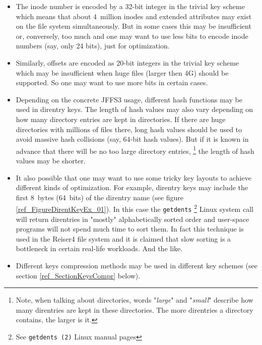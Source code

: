 \begin{itemize}

\item The inode number is encoded by a \mbox{32-bit} integer in the trivial key
scheme which means that about 4~million inodes and extended attributes may
exist on the file system simultaneously. But in some cases this may be
insufficient or, conversely, too much and one may want to use less bits to
encode inode numbers (say, only 24 bits), just for optimization.

\item Similarly, offsets are encoded as \mbox{20-bit} integers in the trivial
key scheme which may be insufficient when huge files (larger then 4G) should be
supported. So one may want to use more bits in certain cases.

\item Depending on the concrete JFFS3 usage, different hash functions may be
used in direntry keys. The length of hash values may also vary depending on how
many directory entries are kept in directories. If there are huge directories
with millions of files there, long hash values should be used to avoid massive
hash collisions (say, \mbox{64-bit} hash values). But if it is known in advance
that there will be no too large directory entries, \footnote{Note, when talking
about directories, words "\emph{large}" and "\emph{small}" describe how many
direntries are kept in these directories. The more direntries a directory
contains, the larger is it.} the length of hash values may be shorter.

\item It also possible that one may want to use some tricky key layouts to
achieve different kinds of optimization. For example, direntry keys may
include the first 8~bytes (64~bits) of the direntry name (see figure
\ref{ref_FigureDirentKeyEx_01}). In this case the \texttt{getdents}
\footnote{See \texttt{getdents (2)} Linux manual pages} Linux system call will
return direntries in "mostly" alphabetically sorted order and \mbox{user-space}
programs will not spend much time to sort them. In fact this technique is used
in the Reiser4 file system and it is claimed that slow sorting is a bottleneck
in certain \mbox{real-life} workloads. And the like.

\item Different keys compression methods may be used in different key schemes
(see section \ref{ref_SectionKeysCompr} below).

\end{itemize}

